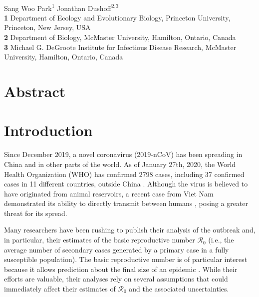 \documentclass[12pt]{article}
\date{\today}
\begin{document}
\begin{flushleft}{
	\Large
	\textbf{}
}
\newline
\\
Sang Woo Park\textsuperscript{1}
Jonathan Dushoff\textsuperscript{2,3}
\\

\bigskip
\textbf{1} Department of Ecology and Evolutionary Biology, Princeton University, Princeton, New Jersey, USA
\\
\textbf{2} Department of Biology, McMaster University, Hamilton, Ontario, Canada
\\
\textbf{3} Michael G. DeGroote Institute for Infectious Disease Research, McMaster University, Hamilton, Ontario, Canada
\\
\bigskip

\end{flushleft}

\section*{Abstract}

\pagebreak

\section{Introduction}

Since December 2019, a novel coronavirus (2019-nCoV) has been
spreading in China and in other parts of the world.
As of January 27th, 2020, the World Health Organization (WHO) has
confirmed 2798 cases, including 37 confirmed cases in 11 different
countries, outside China \citep{who27report}.
Although the virus is believed to have originated
from animal reservoirs, a recent case from Viet Nam
demonstrated its ability to directly transmit between
humans \citep{who26report},
posing a greater threat for its spread.

Many researchers have been rushing to publish their 
analysis of the outbreak \citep{imaincov, riouncov,readncov,zhaoncov,majumderncov,liuncov} 
and, in particular, their
estimates of the basic 
reproductive number $\mathcal R_0$ (i.e., the 
average number of secondary cases generated 
by a primary case in a fully susceptible population).
The basic reproductive number is of particular interest 
because it allows prediction about the final size of an epidemic \citep{anderson1991infectious, ma2006generality, arino2007final, andreasen2011final, miller2012note}.
While their efforts are valuable, their analyses rely on several
assumptions that could immediately affect their estimates of $\mathcal R_0$ and
the associated uncertainties.
\end{document}
